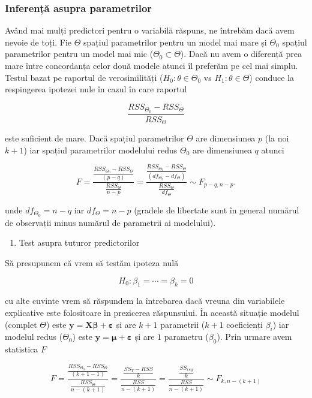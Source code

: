 \documentclass[]{article}
\providecommand{\tightlist}{%
  \setlength{\itemsep}{0pt}\setlength{\parskip}{0pt}}
\begin{document}
\subsubsection{Inferență asupra
parametrilor}\label{inferenta-asupra-parametrilor-1}

Având mai mulți predictori pentru o variabilă răspuns, ne întrebăm dacă
avem nevoie de toți. Fie \(\Theta\) spațiul parametrilor pentru un model
mai mare și \(\Theta_0\) spațiul parametrilor pentru un model mai mic
(\(\Theta_0\subset \Theta\)). Dacă nu avem o diferență prea mare între
concordanța celor două modele atunci îl preferăm pe cel mai simplu.
Testul bazat pe raportul de verosimilități (\(H_0: \theta\in \Theta_0\)
vs \(H_1: \theta\in\Theta\)) conduce la respingerea ipotezei nule în
cazul în care raportul

\[
\frac{RSS_{\Theta_0}-RSS_{\Theta}}{RSS_{\Theta}}
\]

este suficient de mare. Dacă spațiul parametrilor \(\Theta\) are
dimensiunea \(p\) (la noi \(k+1\)) iar spațiul parametrilor modelului
redus \(\Theta_0\) are dimensiunea \(q\) atunci

\[
F = \frac{\frac{RSS_{\Theta_0}-RSS_{\Theta}}{(p-q)}}{\frac{RSS_{\Theta}}{n-p}} = \frac{\frac{RSS_{\Theta_0}-RSS_{\Theta}}{(df_{\Theta_0}-df_{\Theta})}}{\frac{RSS_{\Theta}}{df_{\Theta}}} \sim F_{p-q,n-p}.
\]

unde \(df_{\Theta_0}=n-q\) iar \(df_{\Theta} = n-p\) (gradele de
libertate sunt în general numărul de observații minus numărul de
parametrii ai modelului).

\begin{enumerate}
\def\labelenumi{\alph{enumi})}
\tightlist
\item
  Test asupra tuturor predictorilor
\end{enumerate}

Să presupunem că vrem să testăm ipoteza nulă

\[
H_0: \beta_1 = \cdots = \beta_k = 0
\]

cu alte cuvinte vrem să răspundem la întrebarea dacă vreuna din
variabilele explicative este folositoare în prezicerea răspunsului. În
această situație modelul (complet \(\Theta\)) este
\(\boldsymbol y = \boldsymbol X\boldsymbol \beta+\boldsymbol\varepsilon\)
și are \(k+1\) parametrii (\(k+1\) coeficienți \(\beta_i\)) iar modelul
redus (\(\Theta_0\)) este
\(\boldsymbol y = \boldsymbol \mu+\boldsymbol\varepsilon\) și are \(1\)
parametru (\(\beta_0\)). Prin urmare avem statistica \(F\)

\[
F = \frac{\frac{RSS_{\Theta_0}-RSS_{\Theta}}{(k+1-1)}}{\frac{RSS_{\Theta}}{n-(k+1)}} = \frac{\frac{SS_{T}-RSS}{k}}{\frac{RSS}{n-(k+1)}}= \frac{\frac{SS_{reg}}{k}}{\frac{RSS}{n-(k+1)}}\sim F_{k,n-(k+1)}
\]
\end{document}
